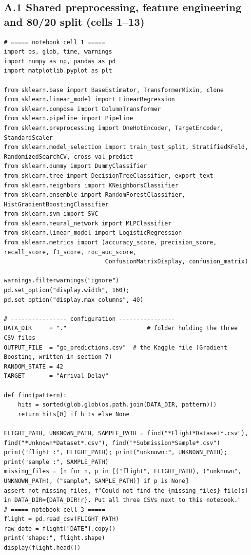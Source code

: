 \documentclass[12pt,a4paper]{article}
\begin{document}
\subsection*{A.1 Shared preprocessing, feature engineering and 80/20 split (cells 1--13)}
\begin{lstlisting}[style=code]
# ===== notebook cell 1 =====
import os, glob, time, warnings
import numpy as np, pandas as pd
import matplotlib.pyplot as plt

from sklearn.base import BaseEstimator, TransformerMixin, clone
from sklearn.linear_model import LinearRegression
from sklearn.compose import ColumnTransformer
from sklearn.pipeline import Pipeline
from sklearn.preprocessing import OneHotEncoder, TargetEncoder, StandardScaler
from sklearn.model_selection import train_test_split, StratifiedKFold, RandomizedSearchCV, cross_val_predict
from sklearn.dummy import DummyClassifier
from sklearn.tree import DecisionTreeClassifier, export_text
from sklearn.neighbors import KNeighborsClassifier
from sklearn.ensemble import RandomForestClassifier, HistGradientBoostingClassifier
from sklearn.svm import SVC
from sklearn.neural_network import MLPClassifier
from sklearn.linear_model import LogisticRegression
from sklearn.metrics import (accuracy_score, precision_score, recall_score, f1_score, roc_auc_score,
                             ConfusionMatrixDisplay, confusion_matrix)

warnings.filterwarnings("ignore")
pd.set_option("display.width", 160); pd.set_option("display.max_columns", 40)

# ---------------- configuration ----------------
DATA_DIR     = "."                       # folder holding the three CSV files
OUTPUT_FILE  = "gb_predictions.csv"  # the Kaggle file (Gradient Boosting, written in section 7)
RANDOM_STATE = 42
TARGET       = "Arrival_Delay"

def find(pattern):
    hits = sorted(glob.glob(os.path.join(DATA_DIR, pattern)))
    return hits[0] if hits else None

FLIGHT_PATH, UNKNOWN_PATH, SAMPLE_PATH = find("*Flight*Dataset*.csv"), find("*Unknown*Dataset*.csv"), find("*Submission*Sample*.csv")
print("flight :", FLIGHT_PATH); print("unknown:", UNKNOWN_PATH); print("sample :", SAMPLE_PATH)
missing_files = [n for n, p in [("flight", FLIGHT_PATH), ("unknown", UNKNOWN_PATH), ("sample", SAMPLE_PATH)] if p is None]
assert not missing_files, f"Could not find the {missing_files} file(s) in DATA_DIR={DATA_DIR!r}. Put all three CSVs next to this notebook."
# ===== notebook cell 3 =====
flight = pd.read_csv(FLIGHT_PATH)
raw_date = flight["DATE"].copy()
print("shape:", flight.shape)
display(flight.head())


\end{lstlisting}
\end{document}
